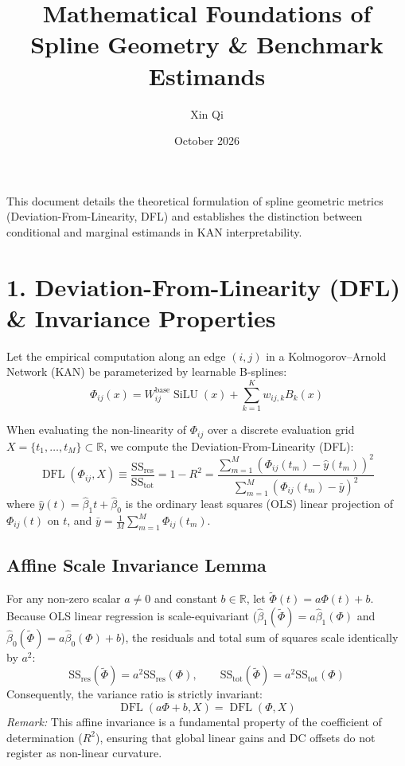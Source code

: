 \documentclass{article}
\title{Mathematical Foundations of Spline Geometry \& Benchmark Estimands}
\author{Xin Qi}
\date{October 2026}
\begin{document}
\maketitle

This document details the theoretical formulation of spline geometric metrics (Deviation-From-Linearity, DFL) and establishes the distinction between conditional and marginal estimands in KAN interpretability.

\section*{1. Deviation-From-Linearity (DFL) \& Invariance Properties}

Let the empirical computation along an edge $(i, j)$ in a Kolmogorov--Arnold Network (KAN) be parameterized by learnable B-splines:
\begin{equation}
\Phi_{ij}(x) = W_{ij}^{\mathrm{base}}\operatorname{SiLU}(x) + \sum_{k=1}^K w_{ij,k} B_k(x)
\end{equation}

When evaluating the non-linearity of $\Phi_{ij}$ over a discrete evaluation grid $X = \{t_1, \dots, t_M\} \subset \mathbb{R}$, we compute the Deviation-From-Linearity (DFL):
\begin{equation}
\operatorname{DFL}(\Phi_{ij}, X) \equiv \frac{\mathrm{SS}_{\mathrm{res}}}{\mathrm{SS}_{\mathrm{tot}}} = 1 - R^2 = \frac{\sum_{m=1}^M (\Phi_{ij}(t_m) - \hat{y}(t_m))^2}{\sum_{m=1}^M (\Phi_{ij}(t_m) - \bar{y})^2}
\end{equation}
where $\hat{y}(t) = \hat{\beta}_1 t + \hat{\beta}_0$ is the ordinary least squares (OLS) linear projection of $\Phi_{ij}(t)$ on $t$, and $\bar{y} = \frac{1}{M}\sum_{m=1}^M \Phi_{ij}(t_m)$.

\subsection*{Affine Scale Invariance Lemma}
For any non-zero scalar $a \neq 0$ and constant $b \in \mathbb{R}$, let $\tilde{\Phi}(t) = a \Phi(t) + b$. Because OLS linear regression is scale-equivariant ($\hat{\beta}_1(\tilde{\Phi}) = a \hat{\beta}_1(\Phi)$ and $\hat{\beta}_0(\tilde{\Phi}) = a \hat{\beta}_0(\Phi) + b$), the residuals and total sum of squares scale identically by $a^2$:
\begin{equation}
\mathrm{SS}_{\mathrm{res}}(\tilde{\Phi}) = a^2 \mathrm{SS}_{\mathrm{res}}(\Phi), \qquad \mathrm{SS}_{\mathrm{tot}}(\tilde{\Phi}) = a^2 \mathrm{SS}_{\mathrm{tot}}(\Phi)
\end{equation}
Consequently, the variance ratio is strictly invariant:
\begin{equation}
\operatorname{DFL}(a \Phi + b, X) = \operatorname{DFL}(\Phi, X)
\end{equation}
\textit{Remark:} This affine invariance is a fundamental property of the coefficient of determination ($R^2$), ensuring that global linear gains and DC offsets do not register as non-linear curvature.
\end{document}
